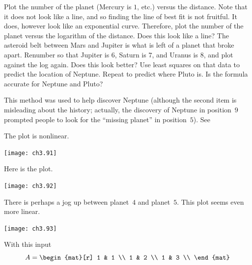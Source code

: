 \begin{exercises}
\begin{center}
     \end{center}
    \begin{exparts}
      \partsitem Plot the number of the planet 
        (Mercury is \( 1 \), etc.) versus the distance.
        Note that it does not look like a line, and so finding the
        line of best fit is not fruitful.
      \partsitem It does, however look like an exponential curve. 
        Therefore, plot the number of the planet versus the
        logarithm of the distance.
        Does this look like a line?
      \partsitem The asteroid belt between Mars and
        Jupiter is 
        what is left of a planet that broke apart.
        Renumber so that Jupiter is $6$, Saturn is $7$, and Uranus is
        $8$, and plot against the log again.
        Does this look better?
      \partsitem Use least squares on that data to predict the 
       location of Neptune.
      \partsitem Repeat to predict where Pluto is.
      \partsitem Is the formula accurate for Neptune and Pluto? 
    \end{exparts}
    This method was used to help discover Neptune (although the second item is
    misleading about the history; actually, the discovery of Neptune 
    in position~$9$ 
    prompted people to look for the ``missing planet'' in position~$5$).
    See \cite{Gardner70}
      \begin{answer}
        \begin{exparts}
          \partsitem The plot is nonlinear.
            \begin{center}  \small
              \texttt{[image: ch3.91]}
            \end{center}
          \partsitem Here is the plot.
           \begin{center}  \small
             \texttt{[image: ch3.92]}
           \end{center}
           There is perhaps a jog up between planet~$4$ and planet~$5$.
          \partsitem This plot seems even more linear.
           \begin{center}  \small
             \texttt{[image: ch3.93]}
           \end{center}
          \partsitem
            With this input
            \begin{equation*}
              A =  
              \begin{mat}[r]
                1 & 1 \\
                1 & 2 \\
                1 & 3 \\

\end{mat}
\end{equation*}
\end{exparts}
\end{answer}
\end{exercises}
